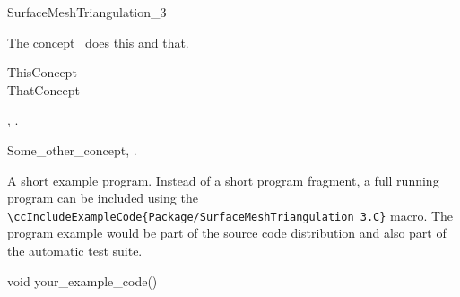 

\begin{ccRefConcept}{SurfaceMeshTriangulation_3}


\ccDefinition
  
The concept \ccRefName\ does this and that.

\ccGeneralizes

ThisConcept \\
ThatConcept

\ccTypes


\ccCreation
{}  %


\ccOperations


\ccHasModels

,
.

\ccSeeAlso

Some\_other\_concept,
.

\ccExample

A short example program.
Instead of a short program fragment, a full running program can be
included using the 
\verb|\ccIncludeExampleCode{Package/SurfaceMeshTriangulation_3.C}| 
macro. The program example would be part of the source code distribution and
also part of the automatic test suite.

\begin{ccExampleCode}
void your_example_code() {
}
\end{ccExampleCode}


\end{ccRefConcept}


